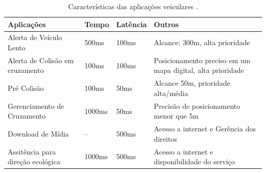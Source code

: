\documentclass[
	12pt,				%
	oneside,			%
	a4paper,			%
	english,			%
	brazil				%
	]{abntex2ppgsi}
\begin{document}
\begin{table}[!h]
	\centering
	\caption{Características das aplicações veiculares \cite{papadimitratos2008secure}.} 
	\label{tab:caracteristiasAppVanet}
	\begin{tabular}{|p{6cm}|p{1.5cm}|p{1.7cm}|p{4.0cm}|}
		\hline
		\rowcolor[gray]{0.7}
		Aplicações	& Tempo & Latência & Outros \\ \hline
		Alerta de Veículo Lento	&  500ms & 100ms & Alcance: 300m, alta prioridade \\ \hline
		
		Alerta de Colisão em cruzamento	 & 100ms & 100ms & Posicionamento preciso em um mapa digital, alta prioridade \\ \hline		
		
		Pré Colisão	&  100ms & 50ms & Alcance 50m, prioridade alta/média \\ \hline				
		Gerenciamento de Cruzamento	&  1000ms & 50ms & Precisão de posicionamento menor que  5m \\ \hline				
		Download de Mídia	& -- & 500ms & Acesso a internet e Gerência dos direitos \\ \hline						
		Assitência para direção ecológica	&  1000ms & 500ms & Acesso a internet e disponibilidade do serviço \\ \hline								
	\end{tabular}
\end{table}

		
\end{document}
